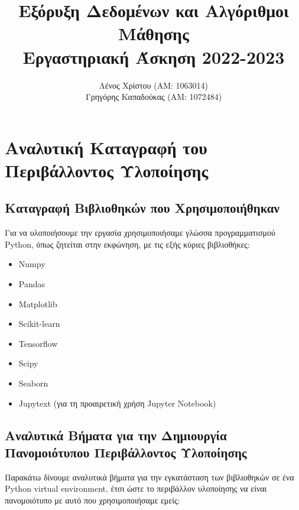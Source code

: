 \documentclass[12pt,a4paper]{article}
\title{Εξόρυξη Δεδομένων και Αλγόριθμοι Μάθησης\\Εργαστηριακή Άσκηση 2022-2023}
\author{Λένος Χρίστου (ΑΜ: 1063014)\\Γρηγόρης Καπαδούκας (ΑΜ: 1072484)}
\begin{document}
\maketitle

\setcounter{section}{-1}
\section{Αναλυτική Καταγραφή του Περιβάλλοντος Υλοποίησης}

\subsection{Καταγραφή Βιβλιοθηκών που Χρησιμοποιήθηκαν}
Για να υλοποιήσουμε την εργασία χρησιμοποιήσαμε γλώσσα προγραμματισμού\\ Python, όπως ζητείται στην εκφώνηση, με τις εξής κύριες βιβλιοθήκες:

\begin{itemize}
    \item Numpy
    \item Pandas
    \item Matplotlib
    \item Scikit-learn
    \item Tensorflow
    \item Scipy
    \item Seaborn
    \item Jupytext (για τη προαιρετική χρήση Jupyter Notebook)
\end{itemize}

\subsection{Αναλυτικά Βήματα για την Δημιουργία Πανομοιότυπου Περιβάλλοντος Υλοποίησης}
Παρακάτω δίνουμε αναλυτικά βήματα για την εγκατάσταση των βιβλιοθηκών σε ένα Python virtual environment, έτσι ώστε το περιβάλλον υλοποίησης να είναι πανομοιότυπο με αυτό που χρησιμοποιήσαμε εμείς:
\end{document}
